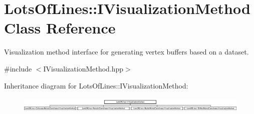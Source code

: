 \hypertarget{class_lots_of_lines_1_1_i_visualization_method}{}\section{Lots\+Of\+Lines\+:\+:I\+Visualization\+Method Class Reference}
\label{class_lots_of_lines_1_1_i_visualization_method}


Visualization method interface for generating vertex buffers based on a dataset.  




{\ttfamily \#include $<$I\+Visualization\+Method.\+hpp$>$}

Inheritance diagram for Lots\+Of\+Lines\+:\+:I\+Visualization\+Method\+:\begin{figure}[H]
\begin{center}
\leavevmode
\includegraphics[height=0.754717cm]{class_lots_of_lines_1_1_i_visualization_method}
\end{center}
\end{figure}
